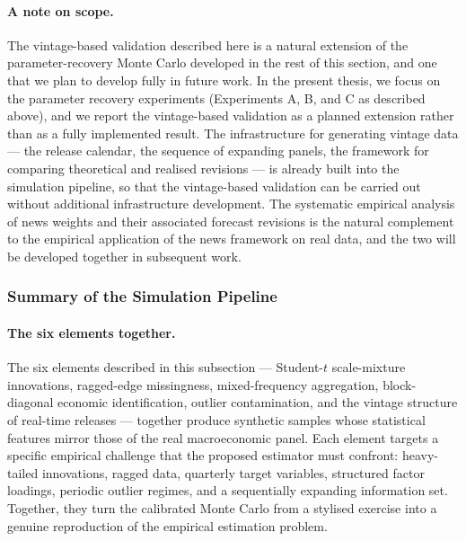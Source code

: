 \documentclass[11pt, a4paper, oneside]{article}
\begin{document}
\paragraph{A note on scope.}
The vintage-based validation described here is a natural
extension of the parameter-recovery Monte Carlo developed in the
rest of this section, and one that we plan to develop fully in
future work. In the present thesis, we focus on the parameter
recovery experiments (Experiments A, B, and C as described
above), and we report the vintage-based validation as a planned
extension rather than as a fully implemented result. The
infrastructure for generating vintage data — the release
calendar, the sequence of expanding panels, the framework for
comparing theoretical and realised revisions — is already built
into the simulation pipeline, so that the vintage-based
validation can be carried out without additional infrastructure
development. The systematic empirical analysis of news weights and
their associated forecast revisions is the natural complement to
the empirical application of the news framework on real data, and
the two will be developed together in subsequent work.

\subsubsection*{Summary of the Simulation Pipeline}
\label{subsubsec:sim-summary}

\paragraph{The six elements together.}
The six elements described in this subsection — Student-$t$
scale-mixture innovations, ragged-edge missingness, mixed-frequency
aggregation, block-diagonal economic identification, outlier
contamination, and the vintage structure of real-time releases —
together produce synthetic samples whose statistical features
mirror those of the real macroeconomic panel. Each element targets
a specific empirical challenge that the proposed estimator must
confront: heavy-tailed innovations, ragged data, quarterly target
variables, structured factor loadings, periodic outlier regimes,
and a sequentially expanding information set. Together, they turn
the calibrated Monte Carlo from a stylised exercise into a genuine
reproduction of the empirical estimation problem.
\end{document}
